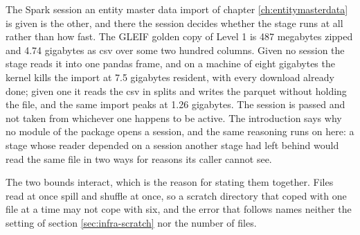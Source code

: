 The Spark session an entity master data import of chapter \ref{ch:entitymasterdata} is given is the other, and there the session decides whether the stage runs at all rather than how fast. The GLEIF golden copy of Level 1 is 487 megabytes zipped and 4.74 gigabytes as csv over some two hundred columns. Given no session the stage reads it into one pandas frame, and on a machine of eight gigabytes the kernel kills the import at 7.5 gigabytes resident, with every download already done; given one it reads the csv in splits and writes the parquet without holding the file, and the same import peaks at 1.26 gigabytes. The session is passed and not taken from whichever one happens to be active. The introduction says why no module of the package opens a session, and the same reasoning runs on here: a stage whose reader depended on a session another stage had left behind would read the same file in two ways for reasons its caller cannot see.

The two bounds interact, which is the reason for stating them together. Files read at once spill and shuffle at once, so a scratch directory that coped with one file at a time may not cope with six, and the error that follows names neither the setting of section \ref{sec:infra-scratch} nor the number of files.
